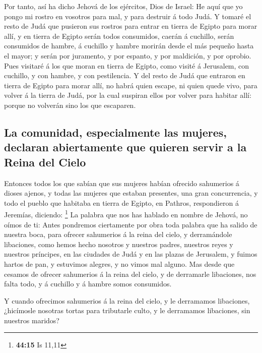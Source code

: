  Por tanto, así ha dicho Jehová de los ejércitos, Dios de
Israel: He aquí que yo pongo mi rostro en vosotros para mal, y para
destruir á todo Judá.  Y tomaré el resto de Judá que
pusieron sus rostros para entrar en tierra de Egipto para morar allí, y
en tierra de Egipto serán todos consumidos, caerán á cuchillo, serán
consumidos de hambre, á cuchillo y hambre morirán desde el más pequeño
hasta el mayor; y serán por juramento, y por espanto, y por maldición, y
por oprobio.  Pues visitaré á los que moran en tierra de
Egipto, como visité á Jerusalem, con cuchillo, y con hambre, y con
pestilencia.  Y del resto de Judá que entraron en tierra
de Egipto para morar allí, no habrá quien escape, ni quien quede vivo,
para volver á la tierra de Judá, por la cual suspiran ellos por volver
para habitar allí: porque no volverán sino los que escaparen.

\hypertarget{la-comunidad-especialmente-las-mujeres-declaran-abiertamente-que-quieren-servir-a-la-reina-del-cielo}{%
\subsection{La comunidad, especialmente las mujeres, declaran
abiertamente que quieren servir a la Reina del
Cielo}\label{la-comunidad-especialmente-las-mujeres-declaran-abiertamente-que-quieren-servir-a-la-reina-del-cielo}}

 Entonces todos los que sabían que sus mujeres habían
ofrecido sahumerios á dioses ajenos, y todas las mujeres que estaban
presentes, una gran concurrencia, y todo el pueblo que habitaba en
tierra de Egipto, en Pathros, respondieron á Jeremías, diciendo:
\footnote{\textbf{44:15} Is 11,11}  La palabra que nos
has hablado en nombre de Jehová, no oímos de ti:  Antes
pondremos ciertamente por obra toda palabra que ha salido de nuestra
boca, para ofrecer sahumerios á la reina del cielo, y derramándole
libaciones, como hemos hecho nosotros y nuestros padres, nuestros reyes
y nuestros príncipes, en las ciudades de Judá y en las plazas de
Jerusalem, y fuimos hartos de pan, y estuvimos alegres, y no vimos mal
alguno.  Mas desde que cesamos de ofrecer sahumerios á la
reina del cielo, y de derramarle libaciones, nos falta todo, y á
cuchillo y á hambre somos consumidos.

 Y cuando ofrecimos sahumerios á la reina del cielo, y le
derramamos libaciones, ¿hicímosle nosotras tortas para tributarle culto,
y le derramamos libaciones, sin nuestros maridos?

